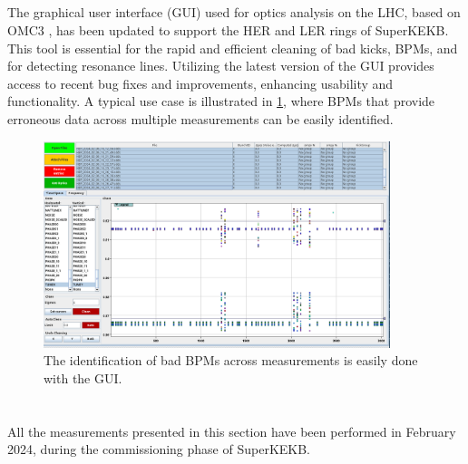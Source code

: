 \subsection{}

The graphical user interface (GUI) used for optics analysis on the LHC, based on OMC3
\cite{omc-team_omc3_2021}, has been updated to support the HER and LER rings of SuperKEKB. This tool
is essential for the rapid and efficient cleaning of bad kicks, BPMs, and for detecting resonance
lines. Utilizing the latest version of the GUI provides access to recent bug fixes and improvements,
enhancing usability and functionality. A typical use case is illustrated in
\cref{fig:kek:gui_bad_bpms}, where BPMs that provide erroneous data across multiple measurements can
be easily identified.

\begin{figure}
    \centering
    \includegraphics[width=0.9\textwidth]{./images/kek/GUIbadbpm.png}
    \caption{The identification of bad BPMs across measurements is easily done with the GUI.}
    \label{fig:kek:gui_bad_bpms}
\end{figure}



\section{}

All the measurements presented in this section have been performed in February 2024, during the
commissioning phase of SuperKEKB.

